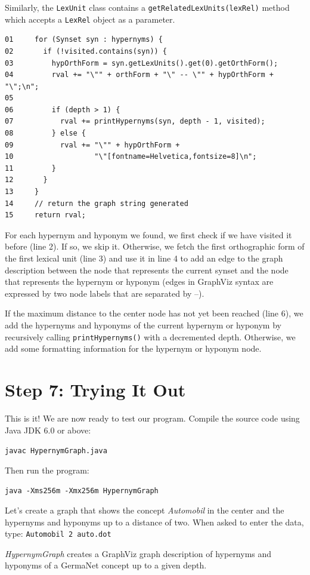 \documentclass[12pt,a4paper,english,utf8]{report}
\begin{document}
Similarly, the \texttt{LexUnit} class contains a \texttt{getRelatedLexUnits(lexRel)} method which accepts a \texttt{LexRel} object as a parameter.

\begin{lstlisting}
01     for (Synset syn : hypernyms) { 
02       if (!visited.contains(syn)) { 
03         hypOrthForm = syn.getLexUnits().get(0).getOrthForm(); 
04         rval += "\"" + orthForm + "\" -- \"" + hypOrthForm + "\";\n"; 
05 
06         if (depth > 1) { 
07           rval += printHypernyms(syn, depth - 1, visited); 
08         } else { 
09           rval += "\"" + hypOrthForm + 
10                   "\"[fontname=Helvetica,fontsize=8]\n"; 
11         } 
12       } 
13     } 
14     // return the graph string generated 
15     return rval;
\end{lstlisting}

For each hypernym and hyponym we found, we first check if we have visited it before (line 2). If so, we skip it. Otherwise, we fetch the first orthographic form of the first lexical unit (line 3) and use it in line 4 to add an edge to the graph description between the node that represents the current synset and the node that represents the hypernym or hyponym (edges in GraphViz syntax are expressed by two node labels that are separated by --).

If the maximum distance to the center node has not yet been reached (line 6), we add the hypernyms and hyponyms of the current hypernym or hyponym by recursively calling \texttt{printHypernyms()} with a decremented depth. Otherwise, we add some formatting information for the hypernym or hyponym node.



\section{Step 7: Trying It Out}
\label{tutorialEnds}
This is it! We are now ready to test our program. Compile the source code using Java JDK 6.0 or above:

\texttt{javac HypernymGraph.java}

Then run the program:

\texttt{java -Xms256m -Xmx256m HypernymGraph}

Let's create a graph that shows the concept \emph{Automobil} in the center and the hypernyms and hyponyms up to a distance of two. When asked to enter the data, type: \texttt{Automobil 2 auto.dot}

\emph{HypernymGraph} creates a GraphViz graph description of hypernyms and hyponyms of a GermaNet concept up to a given depth.
\end{document}
